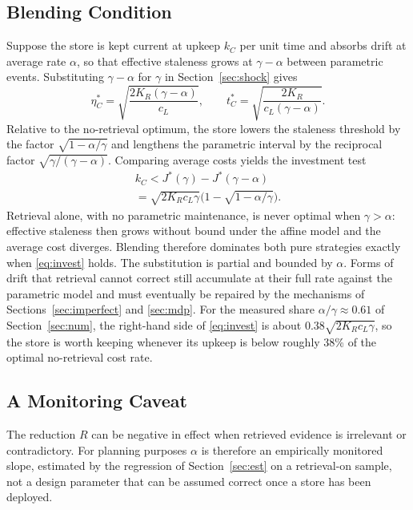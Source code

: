 \documentclass[journal]{IEEEtran}
\begin{document}
\subsection{Blending Condition}
Suppose the store is kept current at upkeep $k_C$ per unit time and absorbs drift at average rate $\alpha$, so that effective staleness grows at $\gamma-\alpha$ between parametric events. Substituting $\gamma-\alpha$ for $\gamma$ in Section~\ref{sec:shock} gives
\begin{equation}
\eta_C^\ast=\sqrt{\frac{2K_R(\gamma-\alpha)}{c_L}},\qquad t_C^\ast=\sqrt{\frac{2K_R}{c_L(\gamma-\alpha)}}.
\label{eq:retr}
\end{equation}
Relative to the no-retrieval optimum, the store lowers the staleness threshold by the factor $\sqrt{1-\alpha/\gamma}$ and lengthens the parametric interval by the reciprocal factor $\sqrt{\gamma/(\gamma-\alpha)}$. Comparing average costs yields the investment test
\begin{multline}
k_C<J^\ast(\gamma)-J^\ast(\gamma-\alpha)\\
=\sqrt{2K_Rc_L\gamma}\Big(1-\sqrt{1-\alpha/\gamma}\Big).
\label{eq:invest}
\end{multline}
Retrieval alone, with no parametric maintenance, is never optimal when $\gamma>\alpha$: effective staleness then grows without bound under the affine model and the average cost diverges. Blending therefore dominates both pure strategies exactly when \eqref{eq:invest} holds. The substitution is partial and bounded by $\alpha$. Forms of drift that retrieval cannot correct still accumulate at their full rate against the parametric model and must eventually be repaired by the mechanisms of Sections~\ref{sec:imperfect} and \ref{sec:mdp}. For the measured share $\alpha/\gamma\approx0.61$ of Section~\ref{sec:num}, the right-hand side of \eqref{eq:invest} is about $0.38\sqrt{2K_Rc_L\gamma}$, so the store is worth keeping whenever its upkeep is below roughly 38\% of the optimal no-retrieval cost rate.

\subsection{A Monitoring Caveat}
The reduction $R$ can be negative in effect when retrieved evidence is irrelevant or contradictory. For planning purposes $\alpha$ is therefore an empirically monitored slope, estimated by the regression of Section~\ref{sec:est} on a retrieval-on sample, not a design parameter that can be assumed correct once a store has been deployed.
\end{document}
